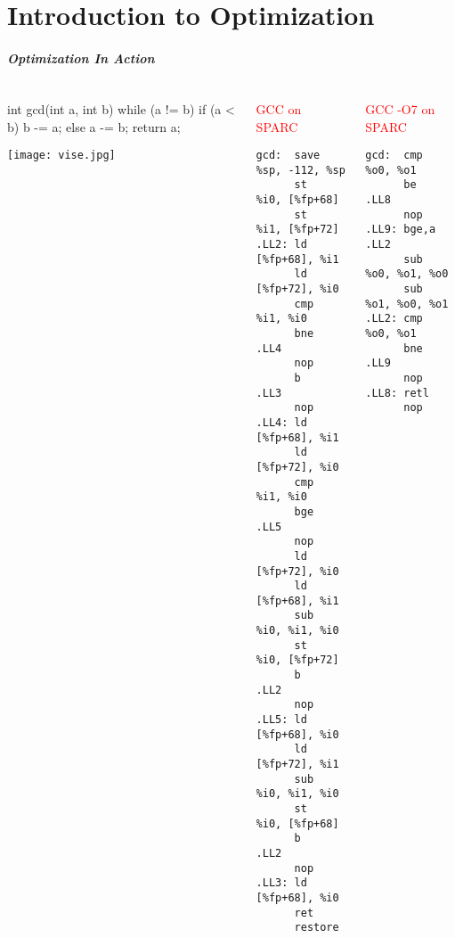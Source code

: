 \documentclass{plt}
\begin{document}
\part{Introduction to Optimization}
\frame{\partpage}

\begin{frame}[fragile]
  \frametitle{Optimization In Action}

\begin{columns}
  \begin{column}[t]{0.4\textwidth}
\mbox{}
\begin{C}
int gcd(int a, int b) {
  while (a != b) {
    if (a < b) b -= a;
    else a -= b;
  }
  return a;
}
\end{C}

\vspace{1pc}

\texttt{[image: vise.jpg]}
  \end{column}
  \begin{column}[t]{0.3\textwidth}
\fontsize{7}{7}\selectfont
\textcolor{red}{GCC on SPARC}
\begin{verbatim}
gcd:  save %sp, -112, %sp
      st   %i0, [%fp+68]
      st   %i1, [%fp+72]
.LL2: ld   [%fp+68], %i1
      ld   [%fp+72], %i0
      cmp  %i1, %i0
      bne  .LL4
      nop 
      b    .LL3
      nop 
.LL4: ld   [%fp+68], %i1
      ld   [%fp+72], %i0
      cmp  %i1, %i0
      bge  .LL5
      nop 
      ld   [%fp+72], %i0
      ld   [%fp+68], %i1
      sub  %i0, %i1, %i0
      st   %i0, [%fp+72]
      b    .LL2
      nop 
.LL5: ld   [%fp+68], %i0
      ld   [%fp+72], %i1
      sub  %i0, %i1, %i0
      st   %i0, [%fp+68]
      b    .LL2
      nop 
.LL3: ld   [%fp+68], %i0
      ret
      restore
\end{verbatim}
  \end{column}
  \begin{column}[t]{0.3\textwidth}
\fontsize{7}{7}\selectfont
\textcolor{red}{GCC -O7 on SPARC}
\begin{verbatim}
gcd:  cmp   %o0, %o1
      be    .LL8
      nop  
.LL9: bge,a .LL2
      sub   %o0, %o1, %o0
      sub   %o1, %o0, %o1
.LL2: cmp   %o0, %o1
      bne   .LL9
      nop
.LL8: retl
      nop
\end{verbatim}
  \end{column}
\end{columns}

\end{frame}
\end{document}
